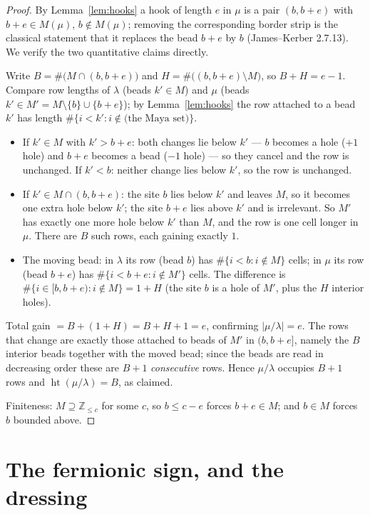 \documentclass[11pt]{article}
\theoremstyle{definition}
\newcommand{\hgt}{\operatorname{ht}}          %
\newcommand{\Z}{\mathbb{Z}}
\begin{document}
\begin{proof}
By Lemma~\ref{lem:hooks} a hook of length $e$ in $\mu$ is a pair $(b,b+e)$ with
$b+e\in M(\mu)$, $b\notin M(\mu)$; removing the corresponding border strip is the
classical statement that it replaces the bead $b+e$ by $b$
(James--Kerber 2.7.13).  We verify the two quantitative claims directly.

Write $B=\#\bigl(M\cap(b,b+e)\bigr)$ and $H=\#\bigl((b,b+e)\setminus M\bigr)$, so
$B+H=e-1$.  Compare row lengths of $\lambda$ (beads $k'\in M$) and $\mu$
(beads $k'\in M'=M\setminus\{b\}\cup\{b+e\}$); by Lemma~\ref{lem:hooks} the row
attached to a bead $k'$ has length $\#\{i<k' : i\notin\text{(the Maya set)}\}$.
\begin{itemize}
\item If $k'\in M$ with $k'>b+e$: both changes lie below $k'$ --- $b$ becomes a
      hole ($+1$ hole) and $b+e$ becomes a bead ($-1$ hole) --- so they cancel and
      the row is unchanged.  If $k'<b$: neither change lies below $k'$, so the row
      is unchanged.
\item If $k'\in M\cap(b,b+e)$: the site $b$ lies below $k'$ and leaves $M$, so it
      becomes one extra hole below $k'$; the site $b+e$ lies above $k'$ and is
      irrelevant.  So $M'$ has exactly one more hole below $k'$ than $M$, and the
      row is one cell longer in $\mu$.  There are $B$ such rows, each gaining
      exactly $1$.
\item The moving bead: in $\lambda$ its row (bead $b$) has $\#\{i<b:i\notin M\}$
      cells; in $\mu$ its row (bead $b+e$) has $\#\{i<b+e:i\notin M'\}$ cells.  The
      difference is $\#\{i\in[b,b+e): i\notin M\}=1+H$ (the site $b$ is a hole of
      $M'$, plus the $H$ interior holes).
\end{itemize}
Total gain $=B+(1+H)=B+H+1=e$, confirming $|\mu/\lambda|=e$.  The rows that change
are exactly those attached to beads of $M'$ in $(b,b+e]$, namely the $B$ interior
beads together with the moved bead; since the beads are read in decreasing order
these are $B+1$ \emph{consecutive} rows.  Hence $\mu/\lambda$ occupies $B+1$ rows
and $\hgt(\mu/\lambda)=B$, as claimed.

Finiteness: $M\supseteq\Z_{\le c}$ for some $c$, so $b\le c-e$ forces $b+e\in M$;
and $b\in M$ forces $b$ bounded above.
\end{proof}

\section{The fermionic sign, and the dressing}
\end{document}
